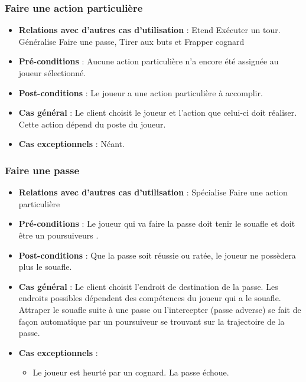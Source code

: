 \documentclass[a4paper,titlepage]{scrreprt}
\begin{document}
    \subsubsection{Faire une action particulière}
      \begin{itemize}
        \item \textbf{Relations avec d'autres cas d'utilisation}  : Etend Exécuter un tour. Généralise Faire une passe, Tirer aux buts et Frapper cognard
        \item \textbf{Pré-conditions} : Aucune action particulière n'a encore été assignée au joueur sélectionné.
        \item \textbf{Post-conditions} : Le joueur a une action particulière à accomplir.
        \item \textbf{Cas général} : Le client choisit le joueur et l’action que celui-ci doit réaliser. Cette action dépend du poste du joueur.
        \item \textbf{Cas exceptionnels} : Néant.
      \end{itemize}
    \subsubsection{Faire une passe}
      \begin{itemize}
        \item \textbf{Relations avec d'autres cas d'utilisation}  : Spécialise Faire une action particulière
        \item \textbf{Pré-conditions} : Le joueur qui va faire la passe doit tenir le \gls{souafle} et doit être un \gls{poursuiveur}s .
        \item \textbf{Post-conditions} : Que la passe soit réussie ou ratée, le joueur ne possèdera plus le souafle.
        \item \textbf{Cas général} : Le client choisit l’endroit de destination de la passe. Les endroits possibles dépendent des compétences du joueur qui a le souafle. Attraper le souafle suite à une passe ou l’intercepter (passe adverse) se fait de façon automatique par un poursuiveur se trouvant sur la trajectoire de la passe.
        \item \textbf{Cas exceptionnels} :
        \begin{itemize}
            \item Le joueur est heurté par un \gls{cognard}. La passe échoue. 
          \end{itemize}
      \end{itemize}
\end{document}
